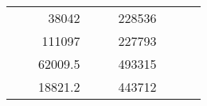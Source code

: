 \begin{table}[H]
\begin{tabular}{|ccrccrccc}
\multicolumn{1}{|c|}{\cellcolor[HTML]{FFFFC7}}                                & \multicolumn{1}{c|}{\cellcolor[HTML]{DAE8FC}}                      & \multicolumn{1}{r|}{\cellcolor[HTML]{DAE8FC}38042}     & \multicolumn{1}{c|}{\cellcolor[HTML]{FFFFC7}}                                & \multicolumn{1}{c|}{\cellcolor[HTML]{DAE8FC}}                       & \multicolumn{1}{r|}{\cellcolor[HTML]{DDFDFF}228536}    &                                                                              &                                                                    &                                                        \\ \cline{3-3} \cline{6-6}
\multicolumn{1}{|c|}{\cellcolor[HTML]{FFFFC7}}                                & \multicolumn{1}{c|}{\cellcolor[HTML]{DAE8FC}}                      & \multicolumn{1}{r|}{\cellcolor[HTML]{DDFDFF}111097}    & \multicolumn{1}{c|}{\cellcolor[HTML]{FFFFC7}}                                & \multicolumn{1}{c|}{\cellcolor[HTML]{DAE8FC}}                       & \multicolumn{1}{r|}{\cellcolor[HTML]{DAE8FC}227793}    &                                                                              &                                                                    &                                                        \\ \cline{3-3} \cline{6-6}
\multicolumn{1}{|c|}{\cellcolor[HTML]{FFFFC7}}                                & \multicolumn{1}{c|}{\cellcolor[HTML]{DAE8FC}}                      & \multicolumn{1}{r|}{\cellcolor[HTML]{DAE8FC}62009.5}   & \multicolumn{1}{c|}{\cellcolor[HTML]{FFFFC7}}                                & \multicolumn{1}{c|}{\cellcolor[HTML]{DAE8FC}}                       & \multicolumn{1}{r|}{\cellcolor[HTML]{DDFDFF}493315}    &                                                                              &                                                                    &                                                        \\ \cline{3-3} \cline{6-6}
\multicolumn{1}{|c|}{\cellcolor[HTML]{FFFFC7}}                                & \multicolumn{1}{c|}{\cellcolor[HTML]{DAE8FC}}                      & \multicolumn{1}{r|}{\cellcolor[HTML]{DDFDFF}18821.2}   & \multicolumn{1}{c|}{\cellcolor[HTML]{FFFFC7}}                                & \multicolumn{1}{c|}{\cellcolor[HTML]{DAE8FC}}                       & \multicolumn{1}{r|}{\cellcolor[HTML]{DAE8FC}443712}    &                                                                              &                                                                    &                                                        \\ \cline{3-3} \cline{6-6}

\end{tabular}
\end{table}
